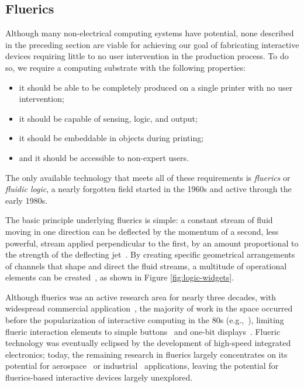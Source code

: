       \subsection{Fluerics}\label{sec:fluerics}
        Although many non-electrical computing systems have potential, none
        described in the preceding section are viable for achieving our
        goal of fabricating interactive devices requiring little to no user
        intervention in the production process. To do so, we require a
        computing substrate with the following properties:

        \begin{itemize}
          \item it should be able to be completely produced on a single
            printer with no user intervention;
          \item it should be capable of sensing, logic, and output;
          \item it should be embeddable in objects during printing;
          \item and it should be accessible to non-expert users.
        \end{itemize}
        
        The only available technology that meets all of these requirements
        is \textit{fluerics} or \textit{fluidic logic}, a nearly forgotten field
        started in the 1960s and active through the early 1980s.
        
        The basic principle underlying fluerics is simple: a constant stream
        of fluid moving in one direction can be deflected by the momentum
        of a second, less powerful, stream applied perpendicular to the
        first, by an amount proportional to the strength of the deflecting
        jet~\cite[p.~64]{CharlesBelsterling:1971}. By creating specific
        geometrical arrangements of channels that shape and direct the
        fluid streams, a multitude of operational elements can be
        created~\cite{Glaettli:1964}, as shown in Figure \ref{fig:logic-widgets}.
        
        Although fluerics was an active research area for nearly three
        decades, with widespread commercial application~\cite{:1968}, the
        majority of work in the space occurred before the popularization of
        interactive computing in the 80s (e.g.,~\cite{Foley:1984a}),
        limiting flueric interaction elements to simple
        buttons~\cite[p.~240]{:1968} and one-bit
        displays~\cite[p.698]{:1968}. Flueric technology was eventually
        eclipsed by the development of high-speed integrated electronics;
        today, the remaining research in fluerics largely concentrates on
        its potential for aerospace~\cite{Ferlauto:2017} or
        industrial~\cite{Lacarelle:2011} applications, leaving the
        potential for fluerics-based interactive devices largely
        unexplored.
        
